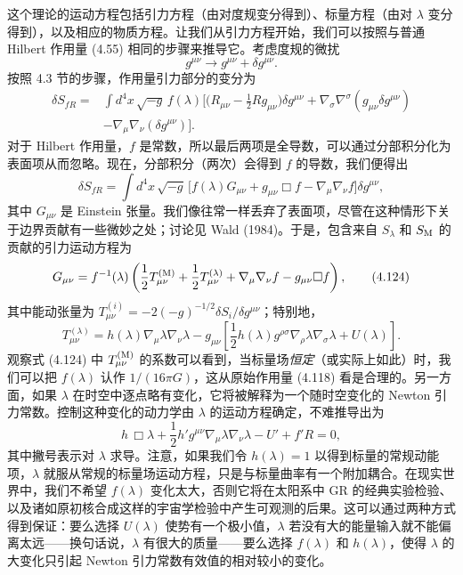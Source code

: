 这个理论的运动方程包括引力方程（由对度规变分得到）、标量方程（由对 $\lambda$ 变分得到），以及相应的物质方程。让我们从引力方程开始，我们可以按照与普通 Hilbert 作用量 (4.55) 相同的步骤来推导它。考虑度规的微扰
\begin{equation*}
g^{\mu\nu} \to g^{\mu\nu} + \delta g^{\mu\nu}.
\tag{4.121}
\end{equation*}
按照 4.3 节的步骤，作用量引力部分的变分为
\begin{align*}
\delta S_{fR} = {}& \int d^4x\,\sqrt{-g}\, f(\lambda)\Big[\Big(R_{\mu\nu} - \frac{1}{2}Rg_{\mu\nu}\Big)\delta g^{\mu\nu} + \nabla_\sigma\nabla^\sigma(g_{\mu\nu}\delta g^{\mu\nu}) \\
&- \nabla_\mu\nabla_\nu(\delta g^{\mu\nu})\Big].
\tag{4.122}
\end{align*}
对于 Hilbert 作用量，$f$ 是常数，所以最后两项是全导数，可以通过分部积分化为表面项从而忽略。现在，分部积分（两次）会得到 $f$ 的导数，我们便得出
\begin{equation*}
\delta S_{fR} = \int d^4x\,\sqrt{-g}\,\big[f(\lambda)G_{\mu\nu} + g_{\mu\nu}\Box f - \nabla_\mu\nabla_\nu f\big]\delta g^{\mu\nu},
\tag{4.123}
\end{equation*}
其中 $G_{\mu\nu}$ 是 Einstein 张量。我们像往常一样丢弃了表面项，尽管在这种情形下关于边界贡献有一些微妙之处；讨论见 Wald (1984)。于是，包含来自 $S_\lambda$ 和 $S_{\rm M}$ 的贡献的引力运动方程为
\begin{equation*}
G_{\mu\nu} = f^{-1}(\lambda)\left(\frac{1}{2}T^{({\rm M})}_{\mu\nu} + \frac{1}{2}T^{(\lambda)}_{\mu\nu} + \nabla_\mu\nabla_\nu f - g_{\mu\nu}\Box f\right),
\tag{4.124}
\end{equation*}
其中能动张量为 $T^{(i)}_{\mu\nu} = -2(-g)^{-1/2}\delta S_i/\delta g^{\mu\nu}$；特别地，
\begin{equation*}
T^{(\lambda)}_{\mu\nu} = h(\lambda)\nabla_\mu\lambda\nabla_\nu\lambda - g_{\mu\nu}\left[\frac{1}{2}h(\lambda)g^{\rho\sigma}\nabla_\rho\lambda\nabla_\sigma\lambda + U(\lambda)\right].
\tag{4.125}
\end{equation*}
观察式 (4.124) 中 $T^{({\rm M})}_{\mu\nu}$ 的系数可以看到，当标量场\emph{恒定}（或实际上如此）时，我们可以把 $f(\lambda)$ 认作 $1/(16\pi G)$，这从原始作用量 (4.118) 看是合理的。另一方面，如果 $\lambda$ 在时空中逐点略有变化，它将被解释为一个随时空变化的 Newton 引力常数。控制这种变化的动力学由 $\lambda$ 的运动方程确定，不难推导出为
\begin{equation*}
h\,\Box\lambda + \frac{1}{2}h'g^{\mu\nu}\nabla_\mu\lambda\nabla_\nu\lambda - U' + f'R = 0,
\tag{4.126}
\end{equation*}
其中撇号表示对 $\lambda$ 求导。注意，如果我们令 $h(\lambda) = 1$ 以得到标量的常规动能项，$\lambda$ 就服从常规的标量场运动方程，只是与标量曲率有一个附加耦合。在现实世界中，我们不希望 $f(\lambda)$ 变化太大，否则它将在太阳系中 GR 的经典实验检验、以及诸如原初核合成这样的宇宙学检验中产生可观测的后果。这可以通过两种方式得到保证：要么选择 $U(\lambda)$ 使势有一个极小值，$\lambda$ 若没有大的能量输入就不能偏离太远——换句话说，$\lambda$ 有很大的质量——要么选择 $f(\lambda)$ 和 $h(\lambda)$，使得 $\lambda$ 的大变化只引起 Newton 引力常数有效值的相对较小的变化。

